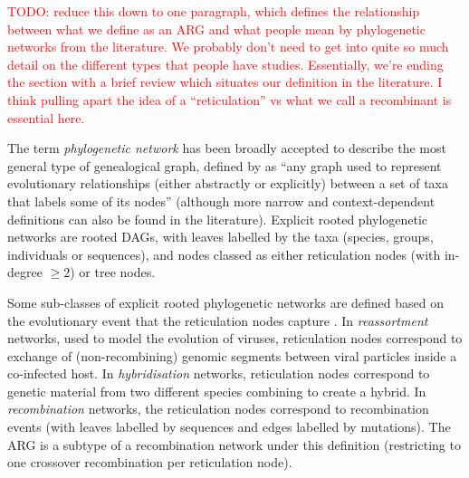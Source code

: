 \documentclass{article}
\begin{document}
\textcolor{red}{TODO: reduce this down to one paragraph, which
defines the relationship between what we define as an ARG and
what people mean by phylogenetic networks from the literature.
We probably don't need to get into quite so much detail on
the different types that people have studies. Essentially,
we're ending the section with a brief review which situates
our definition in the literature. I think pulling apart the
idea of a ``reticulation'' vs what we call a recombinant
is essential here.}

The term \emph{phylogenetic network} has been broadly accepted to describe the most general
type of genealogical graph, defined by \citet{huson2010phylogenetic} as ``any graph used to
represent evolutionary relationships (either abstractly or explicitly) between a set of taxa
that labels some of its nodes'' (although more narrow and context-dependent definitions can also
be found in the literature). Explicit rooted phylogenetic networks are rooted DAGs,
with leaves labelled by the taxa (species, groups, individuals or sequences), and nodes classed
as either reticulation nodes (with in-degree $\geq 2$) or tree nodes.

Some sub-classes of explicit rooted phylogenetic networks are defined based on the evolutionary event that the
reticulation nodes capture \citep{huson2010phylogenetic}. In \emph{reassortment} networks, used to
model the evolution of viruses, reticulation nodes correspond to exchange of
(non-recombining) genomic segments between viral particles inside a co-infected host.
In \emph{hybridisation} networks, reticulation nodes correspond to genetic material from two
different species combining to create a hybrid. In \emph{recombination} networks, the reticulation nodes
correspond to recombination events (with leaves labelled by sequences and edges labelled by mutations).
The ARG is a subtype of a recombination network under this definition (restricting to one crossover
recombination per reticulation node).
\end{document}
